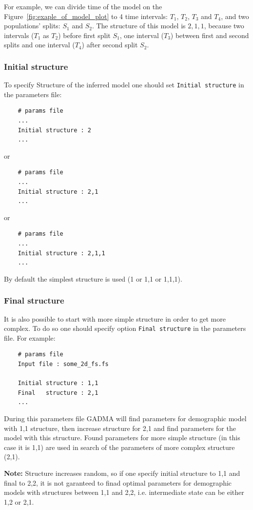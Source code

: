 \documentclass[12pt]{article}
\makeatletter
\newcommand{\py}[1]{\lstinline[language=Python, showstringspaces=False]@#1@}
\makeatother
\begin{document}
For example, we can divide time of the model on the Figure~\ref{fig:exaple_of_model_plot} to 4 time intervals: $T_1$, $T_2$, $T_3$ and $T_4$, and two populations' splits: $S_1$ and $S_2$. The structure of this model is $2,1,1$, because two intervals ($T_1$ as $T_2$) before first split $S_1$, one interval ($T_3$) between first and second splits and one interval ($T_4$) after second split $S_2$.

\subsubsection{Initial structure}
To specify Structure of the inferred model one should set \py{Initial structure} in the parameters file:

\begin{lstlisting}
    # params file
    ...
    Initial structure : 2
    ...
\end{lstlisting}
or
\begin{lstlisting}
    # params file
    ...
    Initial structure : 2,1
    ...
\end{lstlisting}
or
\begin{lstlisting}
    # params file
    ...
    Initial structure : 2,1,1
    ...
\end{lstlisting}

By default the simplest structure is used (1 or 1,1 or 1,1,1).

\subsubsection{Final structure}
It is also possible to start with more simple structure in order to get more complex. To do so one should specify option \py{Final structure} in the parameters file. For example:

\begin{lstlisting}
    # params file
    Input file : some_2d_fs.fs
    
    Initial structure : 1,1
    Final   structure : 2,1
    ...
\end{lstlisting}
During this parameters file GADMA will find parameters for demographic model with 1,1 structure, then increase structure for 2,1 and find parameters for the model with this structure. Found parameters for more simple structure (in this case it is 1,1) are used in search of the parameters of more complex structure (2,1).

\textbf{Note: } Structure increases random, so if one specify initial structure to 1,1 and final to 2,2, it is not garanteed to finad optimal parameters for demographic models with structures between 1,1 and 2,2, i.e. intermediate state can be either 1,2 or 2,1.
\end{document}
